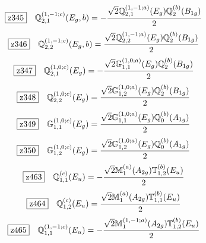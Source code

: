 \documentclass[fleqn,10pt,landscape]{jsarticle}
\begin{document}
\begin{dmath*}
\hspace*{3mm}\fbox{z345}\quad \mathbb{Q}_{2,1}^{(1,-1;c)}(E_{g},b)=- \frac{\sqrt{2} \mathbb{Q}_{2,1}^{(1,-1;a)}(E_{g}) \mathbb{Q}_{2}^{(b)}(B_{1g})}{2}
\end{dmath*}
\begin{dmath*}
\hspace*{3mm}\fbox{z346}\quad \mathbb{Q}_{2,2}^{(1,-1;c)}(E_{g},b)=\frac{\sqrt{2} \mathbb{Q}_{2,2}^{(1,-1;a)}(E_{g}) \mathbb{Q}_{2}^{(b)}(B_{1g})}{2}
\end{dmath*}
\begin{dmath*}
\hspace*{3mm}\fbox{z347}\quad \mathbb{Q}_{2,1}^{(1,0;c)}(E_{g})=- \frac{\sqrt{2} \mathbb{G}_{1,1}^{(1,0;a)}(E_{g}) \mathbb{Q}_{2}^{(b)}(B_{1g})}{2}
\end{dmath*}
\begin{dmath*}
\hspace*{3mm}\fbox{z348}\quad \mathbb{Q}_{2,2}^{(1,0;c)}(E_{g})=\frac{\sqrt{2} \mathbb{G}_{1,2}^{(1,0;a)}(E_{g}) \mathbb{Q}_{2}^{(b)}(B_{1g})}{2}
\end{dmath*}
\begin{dmath*}
\hspace*{3mm}\fbox{z349}\quad \mathbb{G}_{1,1}^{(1,0;c)}(E_{g})=\frac{\sqrt{2} \mathbb{G}_{1,1}^{(1,0;a)}(E_{g}) \mathbb{Q}_{0}^{(b)}(A_{1g})}{2}
\end{dmath*}
\begin{dmath*}
\hspace*{3mm}\fbox{z350}\quad \mathbb{G}_{1,2}^{(1,0;c)}(E_{g})=\frac{\sqrt{2} \mathbb{G}_{1,2}^{(1,0;a)}(E_{g}) \mathbb{Q}_{0}^{(b)}(A_{1g})}{2}
\end{dmath*}
\begin{dmath*}
\hspace*{3mm}\fbox{z463}\quad \mathbb{Q}_{1,1}^{(c)}(E_{u})=- \frac{\sqrt{2} \mathbb{M}_{1}^{(a)}(A_{2g}) \mathbb{T}_{1,2}^{(b)}(E_{u})}{2}
\end{dmath*}
\begin{dmath*}
\hspace*{3mm}\fbox{z464}\quad \mathbb{Q}_{1,2}^{(c)}(E_{u})=\frac{\sqrt{2} \mathbb{M}_{1}^{(a)}(A_{2g}) \mathbb{T}_{1,1}^{(b)}(E_{u})}{2}
\end{dmath*}
\begin{dmath*}
\hspace*{3mm}\fbox{z465}\quad \mathbb{Q}_{1,1}^{(1,-1;c)}(E_{u})=- \frac{\sqrt{2} \mathbb{M}_{1}^{(1,-1;a)}(A_{2g}) \mathbb{T}_{1,2}^{(b)}(E_{u})}{2}
\end{dmath*}
\end{document}
